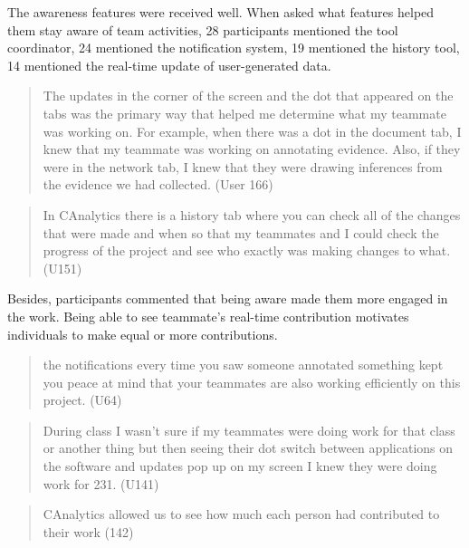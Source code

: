 The awareness features were received well. When asked what features helped them stay aware of team activities, 28 participants mentioned the tool coordinator, 24 mentioned the notification system, 19 mentioned the history tool, 14 mentioned the real-time update of user-generated data.  

\begin{quote}
The updates in the corner of the screen and the dot that appeared on the tabs was the primary way that helped me determine what my teammate was working on. For example, when there was a dot in the document tab, I knew that my teammate was working on annotating evidence. Also, if they were in the network tab, I knew that they were drawing inferences from the evidence we had collected. (User 166)
\end{quote}

\begin{quote}
	In CAnalytics there is a history tab where you can check all of the changes that were made and when so that my teammates and I could check the progress of the project and see who exactly was making changes to what.(U151)
\end{quote}

Besides, participants commented that being aware made them more engaged in the work. Being able to see teammate's real-time contribution motivates individuals to make equal or more contributions. 

\begin{quote}
the notifications every time you saw someone annotated something kept you peace at mind that your teammates are also working efficiently on this project. (U64)
\end{quote}
\begin{quote}
During class I wasn’t sure if my teammates were doing work for that class or another thing but then seeing their dot switch between applications on the software and updates pop up on my screen I knew they were doing work for 231. (U141)
\end{quote}
\begin{quote}
CAnalytics allowed us to see how much each person had contributed to their work (142)
\end{quote}

